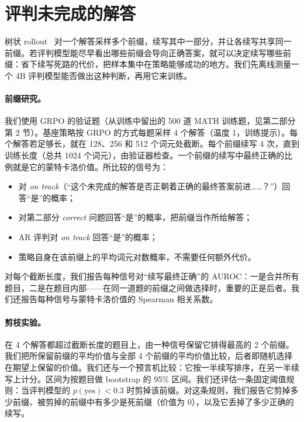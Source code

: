 
\section{评判未完成的解答}\label{sec:prefix}

树状 rollout~\cite{hou2025treerl} 对一个解答采样多个前缀，续写其中一部分，并让各续写共享同一前缀。若评判模型能尽早看出哪些前缀会导向正确答案，就可以决定续写哪些前缀：省下续写死路的代价，把样本集中在策略能够成功的地方。我们先离线测量一个 4B 评判模型能否做出这种判断，再用它来训练。

\paragraph{前缀研究。} 我们使用 GRPO 的验证题（从训练中留出的 500 道 MATH 训练题，见第二部分第 2 节）。基座策略按 GRPO 的方式每题采样 4 个解答（温度 1，训练提示）。每个解答若足够长，就在 128、256 和 512 个词元处截断。每个前缀续写 4 次，直到训练长度（总共 1024 个词元），由验证器检查。一个前缀的续写中最终正确的比例就是它的蒙特卡洛价值。所比较的信号为：
\begin{itemize}
\item \kev{} 对 \emph{on track}（“这个未完成的解答是否正朝着正确的最终答案前进……？”）回答“是”的概率；
\item \kev{} 对第二部分 \emph{correct} 问题回答“是”的概率，把前缀当作所给解答；
\item AR 评判对 \emph{on track} 回答“是”的概率；
\item 策略自身在该前缀上的平均词元对数概率，不需要任何额外代价。
\end{itemize}
对每个截断长度，我们报告每种信号对“续写最终正确”的 AUROC：一是合并所有题目，二是在题目内部——在同一道题的前缀之间做选择时，重要的正是后者。我们还报告每种信号与蒙特卡洛价值的 Spearman 相关系数。

\paragraph{剪枝实验。} 在 4 个解答都超过截断长度的题目上，由一种信号保留它排得最高的 2 个前缀。我们把所保留前缀的平均价值与全部 4 个前缀的平均价值比较，后者即随机选择在期望上保留的价值。我们还与一个预言机比较：它按一半续写排序，在另一半续写上计分。区间为按题目做 bootstrap 的 95\% 区间。我们还评估一条固定阈值规则：当评判模型的 $p(\text{yes})<0.3$ 时剪掉该前缀。对这条规则，我们报告它剪掉多少前缀、被剪掉的前缀中有多少是死前缀（价值为 0），以及它丢掉了多少正确的续写。

